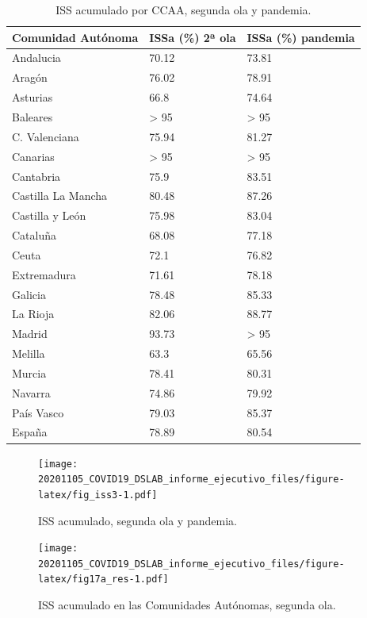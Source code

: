 \documentclass[
  11pt,
]{article}
\begin{document}
\begin{table}[!h]

\caption{\label{tab:tabla}ISS acumulado por CCAA, segunda ola y pandemia.}
\centering
\fontsize{9}{11}\selectfont
\begin{tabular}[t]{l|l|l}
\hline
Comunidad Autónoma & ISSa (\%) 2ª ola & ISSa (\%) pandemia\\
\hline
Andalucia & 70.12 & 73.81\\
\hline
Aragón & 76.02 & 78.91\\
\hline
Asturias & 66.8 & 74.64\\
\hline
Baleares & > 95 & > 95\\
\hline
C. Valenciana & 75.94 & 81.27\\
\hline
Canarias & > 95 & > 95\\
\hline
Cantabria & 75.9 & 83.51\\
\hline
Castilla La Mancha & 80.48 & 87.26\\
\hline
Castilla y León & 75.98 & 83.04\\
\hline
Cataluña & 68.08 & 77.18\\
\hline
Ceuta & 72.1 & 76.82\\
\hline
Extremadura & 71.61 & 78.18\\
\hline
Galicia & 78.48 & 85.33\\
\hline
La Rioja & 82.06 & 88.77\\
\hline
Madrid & 93.73 & > 95\\
\hline
Melilla & 63.3 & 65.56\\
\hline
Murcia & 78.41 & 80.31\\
\hline
Navarra & 74.86 & 79.92\\
\hline
País Vasco & 79.03 & 85.37\\
\hline
España & 78.89 & 80.54\\
\hline
\end{tabular}
\end{table}

\begin{figure}
\centering
\texttt{[image: 20201105\_COVID19\_DSLAB\_informe\_ejecutivo\_files/figure-latex/fig\_iss3-1.pdf]}
\caption{\label{fig:fig_iss3} ISS acumulado, segunda ola y pandemia.}
\end{figure}

\vspace{0.2cm}

\begin{figure}
\centering
\texttt{[image: 20201105\_COVID19\_DSLAB\_informe\_ejecutivo\_files/figure-latex/fig17a\_res-1.pdf]}
\caption{\label{fig:fig17a_res} ISS acumulado en las Comunidades
Autónomas, segunda ola.}
\end{figure}
\end{document}
